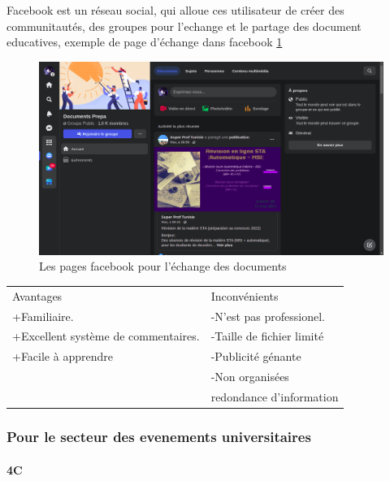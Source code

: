 \documentclass[12pt]{report}
\begin{document}
Facebook est un réseau social, qui alloue ces utilisateur de créer des communitautés, des groupes pour l'echange et le partage des document educatives, exemple de page d'échange dans facebook \ref{fig:facebookechange}
\begin{figure}[h]
    \centering
    \includegraphics[width=.8\textwidth]{groupes facebook}
    \caption{Les pages facebook pour l'échange des documents}
    \label{fig:facebookechange}
\end{figure}

\begin{table}[h!]
\begin{center}
\begin{tabular}{ p{8cm}  p{8cm}  }
Avantages & Inconvénients \\
+Familiaire. & -N'est pas professionel. \\ 
+Excellent système de commentaires. & -Taille de fichier limité \\
+Facile à apprendre & -Publicité génante \\
 & -Non organisées\\
 &  redondance d'information 
\end{tabular}
\end{center}
\end{table}

\subsubsection*{Pour le secteur des evenements universitaires}

\paragraph{4C}
\end{document}
